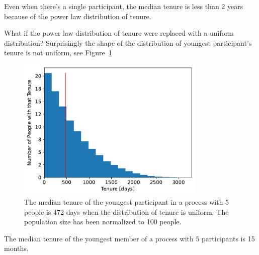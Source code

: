 Even when there's a single participant, the median tenure is less than 2 years because of the power law distribution of tenure.

What if the power law distribution of tenure were replaced with a uniform distribution?
Surprisingly the shape of the distribution of youngest participant's tenure is not uniform, see Figure~\ref{fig:tenure-uniform-5-participants}

\begin{figure}[!htb]  %
    \centering
    \includegraphics[width=0.8\textwidth]{images/tenure_uniform_distribution_with_max_tenure10_and_5_participants_median472.pdf}
    \caption{The median tenure of the youngest participant
 in a process with 5 people is 472 days when the distribution of tenure is uniform. The population size has been normalized to 100 people.}
    \label{fig:tenure-uniform-5-participants}
\end{figure}

The median tenure of the youngest member of a process with 5 participants is 15 months. 

\FloatBarrier